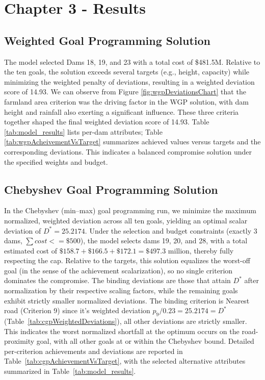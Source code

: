 \section{Chapter 3 - Results}\label{sec:results}

\subsection{Weighted Goal Programming Solution}
The model selected Dams 18, 19, and 23 with a total cost of \$481.5M. Relative to the ten goals, the solution exceeds several targets (e.g., height, capacity) while minimizing the weighted penalty of deviations, resulting in a weighted deviation score of 14.93. We can observe from Figure \ref{fig:wgpDeviationsChart} that the farmland area criterion was the driving factor in the WGP solution, with dam height and rainfall also exerting a significant influence. These three criteria together shaped the final weighted deviation score of 14.93. Table \ref{tab:model_results} lists per-dam attributes; Table \ref{tab:wgpAcheivementVsTarget}    summarizes achieved values versus targets and the corresponding deviations. This indicates a balanced compromise solution under the specified weights and budget.




\subsection{Chebyshev Goal Programming Solution}
In the Chebyshev (min–max) goal programming run, we minimize the maximum normalized, weighted deviation across all ten goals, yielding an optimal scalar deviation of $ D^* = 25.2174$. Under the selection and budget constraints (exactly 3 dams, $\sum cost <= \$500$), the model selects dams 19, 20, and 28, with a total estimated cost of $\$158.7 + \$166.5 + \$172.1 = \$497.3$ million, thereby fully respecting the cap. Relative to the targets, this solution equalizes the worst-off goal (in the sense of the achievement scalarization), so no single criterion dominates the compromise. The binding deviations are those that attain $ D^*$ after normalization by their respective scaling factors, while the remaining goals exhibit strictly smaller normalized deviations. The binding criterion is Nearest road (Criterion 9) since it's weighted deviation $p_9/0.23 = 25.2174 = D^*$ (Table~\ref{tab:cgpWeightedDeviations}), all other deviations are strictly smaller. This indicates the worst normalized shortfall at the optimum occurs on the road-proximity goal, with all other goals at or within the Chebyshev bound. Detailed per-criterion achievements and deviations are reported in Table~\ref{tab:cgpAchievementVsTarget}, with the selected alternative attributes summarized in Table~\ref{tab:model_results}.

